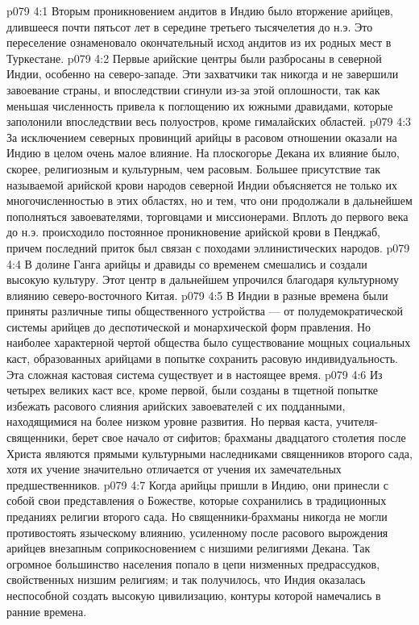 \vs p079 4:1 Вторым проникновением андитов в Индию было вторжение арийцев, длившееся почти пятьсот лет в середине третьего тысячелетия до н.э. Это переселение ознаменовало окончательный исход андитов из их родных мест в Туркестане.
\vs p079 4:2 Первые арийские центры были разбросаны в северной Индии, особенно на северо\hyp{}западе. Эти захватчики так никогда и не завершили завоевание страны, и впоследствии сгинули из\hyp{}за этой оплошности, так как меньшая численность привела к поглощению их южными дравидами, которые заполонили впоследствии весь полуостров, кроме гималайских областей.
\vs p079 4:3 За исключением северных провинций арийцы в расовом отношении оказали на Индию в целом очень малое влияние. На плоскогорье Декана их влияние было, скорее, религиозным и культурным, чем расовым. Большее присутствие так называемой арийской крови народов северной Индии объясняется не только их многочисленностью в этих областях, но и тем, что они продолжали в дальнейшем пополняться завоевателями, торговцами и миссионерами. Вплоть до первого века до н.э. происходило постоянное проникновение арийской крови в Пенджаб, причем последний приток был связан с походами эллинистических народов.
\vs p079 4:4 В долине Ганга арийцы и дравиды со временем смешались и создали высокую культуру. Этот центр в дальнейшем упрочился благодаря культурному влиянию северо\hyp{}восточного Китая.
\vs p079 4:5 В Индии в разные времена были приняты различные типы общественного устройства --- от полудемократической системы арийцев до деспотической и монархической форм правления. Но наиболее характерной чертой общества было существование мощных социальных каст, образованных арийцами в попытке сохранить расовую индивидуальность. Эта сложная кастовая система существует и в настоящее время.
\vs p079 4:6 Из четырех великих каст все, кроме первой, были созданы в тщетной попытке избежать расового слияния арийских завоевателей с их подданными, находящимися на более низком уровне развития. Но первая каста, учителя\hyp{}священники, берет свое начало от сифитов; брахманы двадцатого столетия после Христа являются прямыми культурными наследниками священников второго сада, хотя их учение значительно отличается от учения их замечательных предшественников.
\vs p079 4:7 Когда арийцы пришли в Индию, они принесли с собой свои представления о Божестве, которые сохранились в традиционных преданиях религии второго сада. Но священники\hyp{}брахманы никогда не могли противостоять языческому влиянию, усиленному после расового вырождения арийцев внезапным соприкосновением с низшими религиями Декана. Так огромное большинство населения попало в цепи низменных предрассудков, свойственных низшим религиям; и так получилось, что Индия оказалась неспособной создать высокую цивилизацию, контуры которой намечались в ранние времена.
